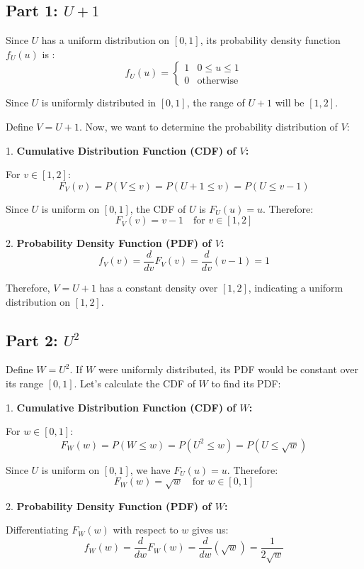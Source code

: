 \documentclass[a4paper,12pt]{article}
\begin{document}
\subsection*{Part 1: \( U + 1 \)}
Since \( U \) has a uniform distribution on \( [0,1] \), its probability density function \( f_U(u) \) is :
\[
f_U(u) = 
\begin{cases} 
      1 & 0 \le u \le 1 \\
      0 & \text{otherwise}
\end{cases}
\]

Since \( U \) is uniformly distributed in \( [0, 1] \), the range of \( U + 1 \) will be \( [1, 2] \).

Define \( V = U + 1 \). Now, we want to determine the probability distribution of \( V \):

1. \textbf{Cumulative Distribution Function (CDF) of \( V \):}

   For \( v \in [1, 2] \):
   \[
   F_V(v) = P(V \le v) = P(U + 1 \le v) = P(U \le v - 1)
   \]
   
   Since \( U \) is uniform on \( [0, 1] \), the CDF of \( U \) is \( F_U(u) = u \). Therefore:
   \[
   F_V(v) = v - 1 \quad \text{for } v \in [1, 2]
   \]

2. \textbf{Probability Density Function (PDF) of \( V \):}
   \[
   f_V(v) = \frac{d}{dv} F_V(v) = \frac{d}{dv} (v - 1) = 1
   \]
   
   Therefore, \( V = U + 1 \) has a constant density over \( [1, 2] \), indicating a uniform distribution on \( [1, 2] \).

\subsection*{Part 2: \( U^2 \)}

Define \( W = U^2 \). If \( W \) were uniformly distributed, its PDF would be constant over its range \( [0, 1] \). Let’s calculate the CDF of \( W \) to find its PDF:

1. \textbf{Cumulative Distribution Function (CDF) of \( W \):}

   For \( w \in [0, 1] \):
   \[
   F_W(w) = P(W \le w) = P(U^2 \le w) = P(U \le \sqrt{w})
   \]
   
   Since \( U \) is uniform on \( [0, 1] \), we have \( F_U(u) = u \). Therefore:
   \[
   F_W(w) = \sqrt{w} \quad \text{for } w \in [0, 1]
   \]

2. \textbf{Probability Density Function (PDF) of \( W \):}

   Differentiating \( F_W(w) \) with respect to \( w \) gives us:
   \[
   f_W(w) = \frac{d}{dw} F_W(w) = \frac{d}{dw} (\sqrt{w}) = \frac{1}{2\sqrt{w}}
   \]
   
\end{document}
